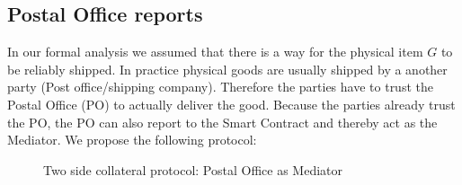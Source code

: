 \documentclass{cacthesis}
\begin{document}
\subsection{Postal Office reports}
In our formal analysis we assumed that there is a way for the physical item $G$ to be reliably shipped. In practice physical goods are usually shipped by a another party (Post office/shipping company).
Therefore the parties have to trust the Postal Office (PO) to actually deliver the good. Because the parties already trust the PO, the PO can also report to the Smart Contract and thereby act as the Mediator.
We propose the following protocol:
\begin{figure}[htb!]
    \centering
    \caption{Two side collateral protocol: Postal Office as Mediator}
    \label{pro:two-side-collateral-postal}
\end{figure}
\end{document}
